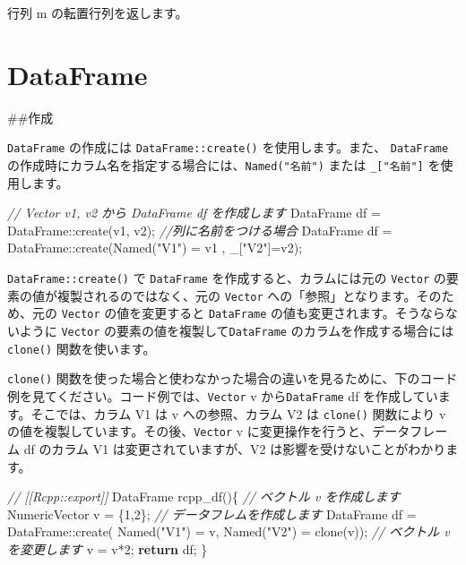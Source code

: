 \documentclass[]{book}
\newenvironment{Shaded}{\begin{snugshade}}{\end{snugshade}}
\newcommand{\CommentTok}[1]{\textcolor[rgb]{0.56,0.35,0.01}{\textit{#1}}}
\newcommand{\ControlFlowTok}[1]{\textcolor[rgb]{0.13,0.29,0.53}{\textbf{#1}}}
\newcommand{\DecValTok}[1]{\textcolor[rgb]{0.00,0.00,0.81}{#1}}
\newcommand{\NormalTok}[1]{#1}
\newcommand{\StringTok}[1]{\textcolor[rgb]{0.31,0.60,0.02}{#1}}
\begin{document}
行列 m の転置行列を返します。

\hypertarget{dataframe}{%
\chapter{DataFrame}\label{dataframe}}

\#\#作成

\texttt{DataFrame} の作成には \texttt{DataFrame::create()} を使用します。また、 \texttt{DataFrame} の作成時にカラム名を指定する場合には、\texttt{Named("名前")} または \texttt{\_{[}"名前"{]}} を使用します。

\begin{Shaded}
\begin{Highlighting}[]
\CommentTok{// Vector v1, v2 から DataFrame df を作成します}
\NormalTok{DataFrame df = DataFrame::create(v1, v2);}
\CommentTok{//列に名前をつける場合}
\NormalTok{DataFrame df = DataFrame::create(Named(}\StringTok{"V1"}\NormalTok{) = v1 , _[}\StringTok{"V2"}\NormalTok{]=v2);}
\end{Highlighting}
\end{Shaded}

\texttt{DataFrame::create()} で \texttt{DataFrame} を作成すると、カラムには元の \texttt{Vector} の要素の値が複製されるのではなく、元の \texttt{Vector} への「参照」となります。そのため、元の \texttt{Vector} の値を変更すると \texttt{DataFrame} の値も変更されます。そうならないように \texttt{Vector} の要素の値を複製して\texttt{DataFrame} のカラムを作成する場合には \texttt{clone()} 関数を使います。

\texttt{clone()} 関数を使った場合と使わなかった場合の違いを見るために、下のコード例を見てください。コード例では、\texttt{Vector} v から\texttt{DataFrame} df を作成しています。そこでは、カラム V1 は v への参照、カラム V2 は \texttt{clone()} 関数により v の値を複製しています。その後、\texttt{Vector} v に変更操作を行うと、データフレーム df のカラム V1 は変更されていますが、V2 は影響を受けないことがわかります。

\begin{Shaded}
\begin{Highlighting}[]
\CommentTok{// [[Rcpp::export]]}
\NormalTok{DataFrame rcpp_df()\{}
    \CommentTok{// ベクトル v を作成します}
\NormalTok{    NumericVector v = \{}\DecValTok{1}\NormalTok{,}\DecValTok{2}\NormalTok{\};}
    \CommentTok{// データフレムを作成します}
\NormalTok{    DataFrame df = DataFrame::create( Named(}\StringTok{"V1"}\NormalTok{) = v,}
\NormalTok{                                      Named(}\StringTok{"V2"}\NormalTok{) = clone(v));}
    \CommentTok{// ベクトル v を変更します                                }
\NormalTok{    v = v*}\DecValTok{2}\NormalTok{;}
    \ControlFlowTok{return}\NormalTok{ df;}
\NormalTok{\}}
\end{Highlighting}
\end{Shaded}
\end{document}
